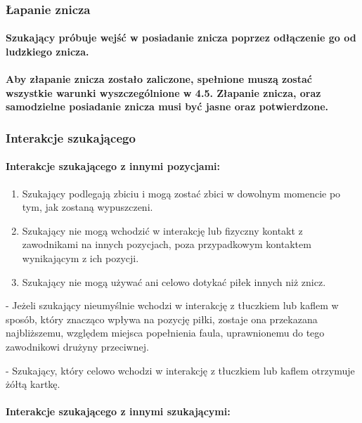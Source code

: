 \documentclass[12pt]{article}
\newcommand\yellowcard{\bgroup\color{yellow}\markoverwith{\textcolor{yellow}{\rule[-0.5ex]{2pt}{0.4pt}}}\ULon}
\newcommand\other{\bgroup\color{green}\markoverwith{\textcolor{green}{\rule[-0.5ex]{2pt}{0.4pt}}}\ULon}
\begin{document}
\subsubsection{Łapanie znicza}

\paragraph{Szukający próbuje wejść w posiadanie znicza poprzez
	odłączenie go od ludzkiego znicza.}

\paragraph{Aby złapanie znicza zostało zaliczone, spełnione muszą
	zostać wszystkie warunki wyszczególnione w 4.5. Złapanie znicza, oraz
	samodzielne posiadanie znicza musi być jasne oraz potwierdzone.}

\subsubsection{Interakcje szukającego}

\paragraph{Interakcje szukającego z innymi pozycjami: }

\begin{enumerate}
	\item
	      Szukający podlegają zbiciu i mogą zostać zbici w dowolnym momencie po
	      tym, jak zostaną wypuszczeni.
	\item
	      Szukający nie mogą wchodzić w interakcję lub fizyczny kontakt z
	      zawodnikami na innych pozycjach, poza przypadkowym kontaktem
	      wynikającym z ich pozycji.
	\item
	      Szukający nie mogą używać ani celowo dotykać piłek innych niż znicz.
\end{enumerate}

\other{Strata} - Jeżeli szukający nieumyślnie wchodzi w interakcję z
tłuczkiem lub kaflem w sposób, który znacząco wpływa na pozycję piłki,
zostaje ona przekazana najbliższemu, względem miejsca popełnienia faula,
uprawnionemu do tego zawodnikowi drużyny przeciwnej.

\yellowcard{Żółta kartka} - Szukający, który celowo wchodzi w interakcję z
tłuczkiem lub kaflem otrzymuje żółtą kartkę.

\paragraph{Interakcje szukającego z innymi szukającymi:}
\end{document}
